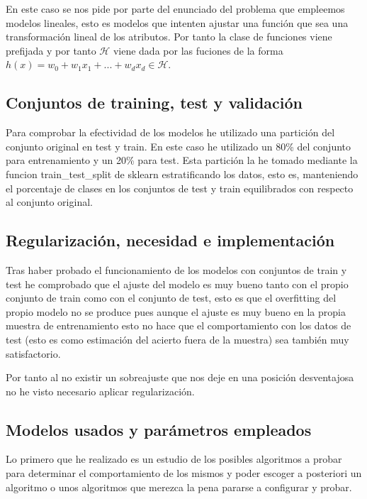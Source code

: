\documentclass[12pt,a4paper]{article}
\begin{document}
En este caso se nos pide por parte del enunciado del problema que empleemos modelos lineales, esto es modelos que intenten ajustar una función que sea una transformación lineal de los atributos. Por tanto la clase de funciones viene prefijada y por tanto $\mathcal{H}$ viene dada por las fuciones de la forma $h(x) = w_0 + w_1 x_1 + ... + w_d x_d \in \mathcal{H}$.

\subsection{Conjuntos de training, test y validación}

Para comprobar la efectividad de los modelos he utilizado una partición del conjunto original en test y train. En este caso he utilizado un 80\% del conjunto para entrenamiento y un 20\% para test. Esta partición la he tomado mediante la funcion train\_test\_split de sklearn estratificando los datos, esto es, manteniendo el porcentaje de clases en los conjuntos de test y train equilibrados con respecto al conjunto original.

\subsection{Regularización, necesidad e implementación}

Tras haber probado el funcionamiento de los modelos con conjuntos de train y test he comprobado que el ajuste del modelo es muy bueno tanto con el propio conjunto de train como con el conjunto de test, esto es que el overfitting del propio modelo no se produce pues aunque el ajuste es muy bueno en la propia muestra de entrenamiento esto no hace que el comportamiento con los datos de test (esto es como estimación del acierto fuera de la muestra) sea también muy satisfactorio.

Por tanto al no existir un sobreajuste que nos deje en una posición desventajosa no he visto necesario aplicar regularización.

\subsection{Modelos usados y parámetros empleados}

Lo primero que he realizado es un estudio de los posibles algoritmos a probar para determinar el comportamiento de los mismos y poder escoger a posteriori un algoritmo o unos algoritmos que merezca la pena pararse a configurar y probar.
\end{document}
